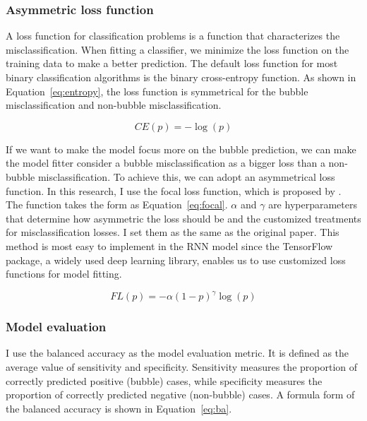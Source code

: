 \documentclass[12pt, man, a4paper, floatsintext]{apa7}
\begin{document}
\subsubsection{Asymmetric loss function}

A loss function for classification problems is a function that characterizes the misclassification. When fitting a classifier, we minimize the loss function on the training data to make a better prediction. The default loss function for most binary classification algorithms is the binary cross-entropy function. As shown in Equation~\ref{eq:entropy}, the loss function is symmetrical for the bubble misclassification and non-bubble misclassification. 

\begin{equation}
    CE(p) = -\log(p)
    \label{eq:entropy}
\end{equation}

If we want to make the model focus more on the bubble prediction, we can make the model fitter consider a bubble misclassification as a bigger loss than a non-bubble misclassification. To achieve this, we can adopt an asymmetrical loss function. In this research, I use the focal loss function, which is proposed by \textcite{focal}. The function takes the form as Equation~\ref{eq:focal}. $\alpha$ and $\gamma$ are hyperparameters that determine how asymmetric the loss should be and the customized treatments for misclassification losses. I set them as the same as the original paper. This method is most easy to implement in the RNN model since the TensorFlow package, a widely used deep learning library, enables us to use customized loss functions for model fitting.

\begin{equation}
    FL(p) = -\alpha (1-p)^\gamma \log(p)
    \label{eq:focal}
\end{equation}

\subsubsection{Model evaluation}

I use the balanced accuracy as the model evaluation metric. It is defined as the average value of sensitivity and specificity. Sensitivity measures the proportion of correctly predicted positive (bubble) cases, while specificity measures the proportion of correctly predicted negative (non-bubble) cases. A formula form of the balanced accuracy is shown in Equation~\ref{eq:ba}.
\end{document}
